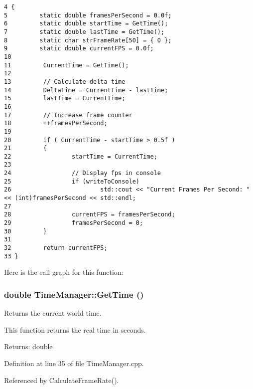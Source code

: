 \begin{Code}\begin{verbatim}4 {
5         static double framesPerSecond = 0.0f;                                                           
6         static double startTime = GetTime();                                                            
7         static double lastTime = GetTime();                                                                     
8         static char strFrameRate[50] = { 0 };                                                           
9         static double currentFPS = 0.0f;                                                                        
10 
11         CurrentTime = GetTime();
12 
13         // Calculate delta time
14         DeltaTime = CurrentTime - lastTime;
15         lastTime = CurrentTime;
16 
17         // Increase frame counter
18         ++framesPerSecond;
19         
20         if ( CurrentTime - startTime > 0.5f )
21         {
22                 startTime = CurrentTime;
23 
24                 // Display fps in console
25                 if (writeToConsole)
26                         std::cout << "Current Frames Per Second: " << (int)framesPerSecond << std::endl;
27         
28                 currentFPS = framesPerSecond;
29                 framesPerSecond = 0;
30         }
31 
32         return currentFPS;
33 }
\end{verbatim}
\end{Code}




Here is the call graph for this function:\hypertarget{class_time_manager_7ba98f4d4ea9a0519007d127a460b259}{
\subsubsection[GetTime]{\setlength{\rightskip}{0pt plus 5cm}double TimeManager::GetTime ()}}
\label{class_time_manager_7ba98f4d4ea9a0519007d127a460b259}


Returns the current world time. 

This function returns the real time in seconds.

\begin{Desc}
\item[Returns:]double \end{Desc}


Definition at line 35 of file TimeManager.cpp.

Referenced by CalculateFrameRate().

